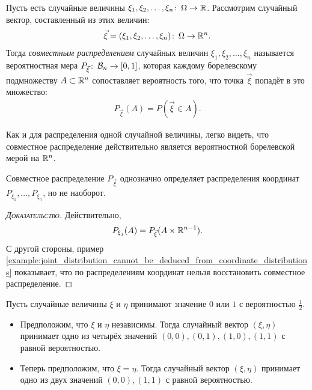 \documentclass[../main.tex]{subfiles}
\begin{document}
\begin{df}
 Пусть есть случайные величины $ \xi_1, \xi_2, \ldots, \xi_n \colon\,\Omega\to\mathbb{R} $. Рассмотрим случайный вектор, составленный из этих величин:
 \begin{align*}
  \vec\xi = (\xi_1, \xi_2, \ldots,\xi_n)\colon\,\Omega \to \mathbb{R}^{n}.
 \end{align*} Тогда \textit{совместным распределением} случайных величин $ \xi_1, \xi_2, \ldots, \xi_n $ называется вероятностная мера $ P_{\vec\xi} \colon\,\mathcal B_n \to [0,1] $, которая каждому борелевскому подмножеству $ A \subset \mathbb{R}^{n} $ сопоставляет вероятность того, что точка $ \vec\xi $ попадёт в это множество:
 \begin{align*}
  P_{\vec\xi}(A) = P(\vec\xi \in A).
 \end{align*} 
\end{df}
\begin{remrk*}
 Как и для распределения одной случайной величины, легко видеть, что совместное распределение действительно является вероятностной борелевской мерой на $ \mathbb{R}^{n} $.
\end{remrk*}
\begin{remrk}
 Совместное распределение $ P_{\vec\xi} $ однозначно определяет распределения координат $ P_{\xi_1}, \ldots, P_{\xi_n} $, но не наоборот.
\end{remrk} 
\begin{proof}[\normalfont\textsc{Доказательство}]
 Действительно, 
 \begin{align*}
  P_{\xi_j}(A) = P_{\vec\xi}(A \times \mathbb{R}^{n-1}).
 \end{align*} С другой стороны, пример \ref{example:joint_distribution_cannot_be_deduced_from_coordinate_distributions} показывает, что по распределениям координат нельзя восстановить совместное распределение.
\end{proof}
\begin{exmpl}
 \label{example:joint_distribution_cannot_be_deduced_from_coordinate_distributions}
 Пусть случайные величины $ \xi $ и $ \eta $ принимают значение $ 0 $ или $ 1 $ с вероятностью $ \frac{1}{2} $.
 \begin{itemize}
  \item Предположим, что $ \xi $ и $ \eta $ независимы. Тогда случайный вектор $ (\xi, \eta) $ принимает одно из четырёх значений $ (0,0),(0,1),(1,0),(1,1) $ с равной вероятностью.
  \item Теперь предположим, что $ \xi = \eta $. Тогда случайный вектор $ (\xi,\eta) $ принимает одно из двух значений $ (0,0), (1,1) $ с равной вероятностью.
 \end{itemize}
\end{exmpl}
\end{document}
